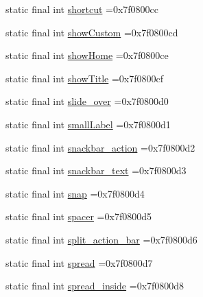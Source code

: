 \begin{DoxyCompactItemize}
\item 
static final int \mbox{\hyperlink{classcom_1_1example_1_1trainawearapplication_1_1_r_1_1id_aa9310940a7088109dd5b7bad55815dda}{shortcut}} =0x7f0800cc
\item 
static final int \mbox{\hyperlink{classcom_1_1example_1_1trainawearapplication_1_1_r_1_1id_ab0990b6a542071fc8284bd1ff22885f0}{show\+Custom}} =0x7f0800cd
\item 
static final int \mbox{\hyperlink{classcom_1_1example_1_1trainawearapplication_1_1_r_1_1id_aa471359b437e10d1e98bde2bdd69e2b5}{show\+Home}} =0x7f0800ce
\item 
static final int \mbox{\hyperlink{classcom_1_1example_1_1trainawearapplication_1_1_r_1_1id_a7ae5b7f729df2b92e1516ae71efb3866}{show\+Title}} =0x7f0800cf
\item 
static final int \mbox{\hyperlink{classcom_1_1example_1_1trainawearapplication_1_1_r_1_1id_a3c54920b89e1af11f869bcade919ddc2}{slide\+\_\+over}} =0x7f0800d0
\item 
static final int \mbox{\hyperlink{classcom_1_1example_1_1trainawearapplication_1_1_r_1_1id_a15b45153b81084a1c2c83d41d5182680}{small\+Label}} =0x7f0800d1
\item 
static final int \mbox{\hyperlink{classcom_1_1example_1_1trainawearapplication_1_1_r_1_1id_a67b5358e5178a3789d4d299c0e2d903c}{snackbar\+\_\+action}} =0x7f0800d2
\item 
static final int \mbox{\hyperlink{classcom_1_1example_1_1trainawearapplication_1_1_r_1_1id_abe60aa195d20c413cf934e44bc454e2d}{snackbar\+\_\+text}} =0x7f0800d3
\item 
static final int \mbox{\hyperlink{classcom_1_1example_1_1trainawearapplication_1_1_r_1_1id_acffbe31448eae1b4259a67bb923386ca}{snap}} =0x7f0800d4
\item 
static final int \mbox{\hyperlink{classcom_1_1example_1_1trainawearapplication_1_1_r_1_1id_a8b90fbadaae34eec7b78baa972330665}{spacer}} =0x7f0800d5
\item 
static final int \mbox{\hyperlink{classcom_1_1example_1_1trainawearapplication_1_1_r_1_1id_a3374cddaa496d32711a6e9453a685de6}{split\+\_\+action\+\_\+bar}} =0x7f0800d6
\item 
static final int \mbox{\hyperlink{classcom_1_1example_1_1trainawearapplication_1_1_r_1_1id_aa690ce59a8f8129c0e88aba3c9b7e283}{spread}} =0x7f0800d7
\item 
static final int \mbox{\hyperlink{classcom_1_1example_1_1trainawearapplication_1_1_r_1_1id_a4e4bf16348c3337d073676cf53f67213}{spread\+\_\+inside}} =0x7f0800d8

\end{DoxyCompactItemize}
